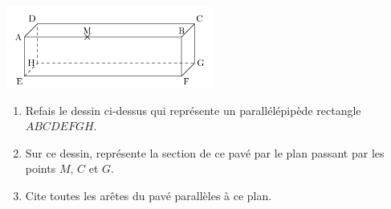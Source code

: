 
\begin{center}
\includegraphics[scale=1]{RepS-39.png} 
\end{center}
\begin{enumerate}
	\item Refais le dessin ci-dessus qui représente un parallélépipède rectangle $ABCDEFGH$.
	\item Sur ce dessin, représente la section de ce pavé par le plan  passant par les points $M$, $C$ et $G$.
	\item Cite toutes les arêtes du pavé parallèles à ce plan.
\end{enumerate}

